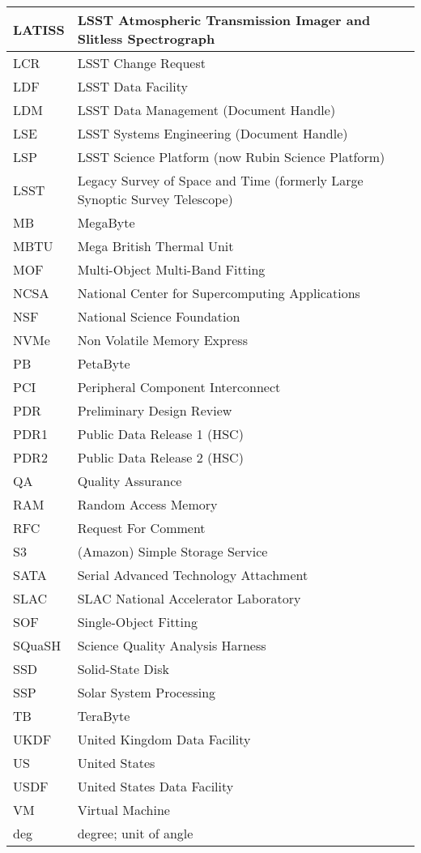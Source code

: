 \begin{longtable}{p{}p{}}
LATISS & LSST Atmospheric Transmission Imager and Slitless Spectrograph \\\hline
LCR & LSST Change Request \\\hline
LDF & LSST Data Facility \\\hline
LDM & LSST Data Management (Document Handle) \\\hline
LSE & LSST Systems Engineering (Document Handle) \\\hline
LSP & LSST Science Platform (now Rubin Science Platform) \\\hline
LSST & Legacy Survey of Space and Time (formerly Large Synoptic Survey Telescope) \\\hline
MB & MegaByte \\\hline
MBTU & Mega British Thermal Unit \\\hline
MOF & Multi-Object Multi-Band Fitting \\\hline
NCSA & National Center for Supercomputing Applications \\\hline
NSF & National Science Foundation \\\hline
NVMe & Non Volatile Memory Express \\\hline
PB & PetaByte \\\hline
PCI & Peripheral Component Interconnect \\\hline
PDR & Preliminary Design Review \\\hline
PDR1 & Public Data Release 1 (HSC) \\\hline
PDR2 & Public Data Release 2 (HSC) \\\hline
QA & Quality Assurance \\\hline
RAM & Random Access Memory \\\hline
RFC & Request For Comment \\\hline
S3 & (Amazon) Simple Storage Service  \\\hline
SATA & Serial Advanced Technology Attachment \\\hline
SLAC & SLAC National Accelerator Laboratory \\\hline
SOF & Single-Object Fitting \\\hline
SQuaSH & Science Quality Analysis Harness \\\hline
SSD & Solid-State Disk \\\hline
SSP & Solar System Processing \\\hline
TB & TeraByte \\\hline
UKDF & United Kingdom Data Facility \\\hline
US & United States \\\hline
USDF & United States Data Facility \\\hline
VM & Virtual Machine \\\hline
deg & degree; unit of angle \\\hline
\end{longtable}
